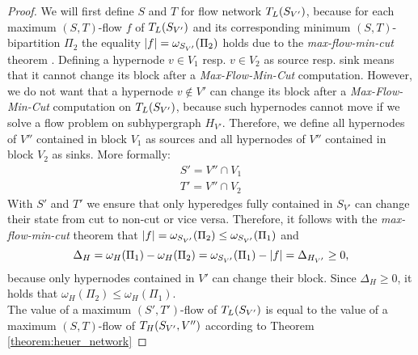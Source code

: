 \begin{proof}
We will first define $S$ and $T$ for flow network
$T_L(S_{V'})$, because for each maximum $(S,T)$-flow $f$ of $T_L(S_{V'})$
and its corresponding minimum $(S,T)$-bipartition $\Pi_2$ the equality 
$|f| = \omega_{S_{V'}}(\Pi_2)$ holds due to the 
\emph{max-flow-min-cut} theorem \cite{ford1956maximal}. 
Defining a hypernode $v \in V_1$ resp. $v \in V_2$ as source resp. sink means that
it cannot change its block after a \emph{Max-Flow-Min-Cut} computation.
However, we do not want that a hypernode $v \notin V'$ can change its block after
a \emph{Max-Flow-Min-Cut} computation on $T_L(S_{V'})$, because such hypernodes
cannot move if we solve a flow problem on subhypergraph $H_{V'}$. Therefore, we define
all hypernodes of $V''$ contained in block $V_1$ as sources and all hypernodes of $V''$ contained
in block $V_2$ as sinks. More formally:
\begin{align*}
S' = V'' \cap V_1 \\
T' = V'' \cap V_2 
\end{align*}
With $S'$ and $T'$ we ensure that only hyperedges fully contained in $S_{V'}$ can
change their state from cut to non-cut or vice versa. Therefore, it follows with
the \emph{max-flow-min-cut} theorem \cite{ford1956maximal} that $|f| = \omega_{S_{V'}}(\Pi_2)
\le \omega_{S_{V'}}(\Pi_1)$ and 
\[\Delta_{H} = \omega_H(\Pi_1) - \omega_H(\Pi_2) = \omega_{S_{V'}}(\Pi_1) - |f| = \Delta_{H_{V'}} \ge 0 \text{,}\]
because only hypernodes contained in $V'$ can change their block. Since $\Delta_H \ge 0$,
it holds that $\omega_H(\Pi_2) \le \omega_H(\Pi_1)$.\\
The value of a maximum $(S',T')$-flow of $T_L(S_{V'})$ is equal to the value of a maximum
$(S,T)$-flow of $T_H(S_{V'},V'')$ according to Theorem \ref{theorem:heuer_network}

\end{proof}
